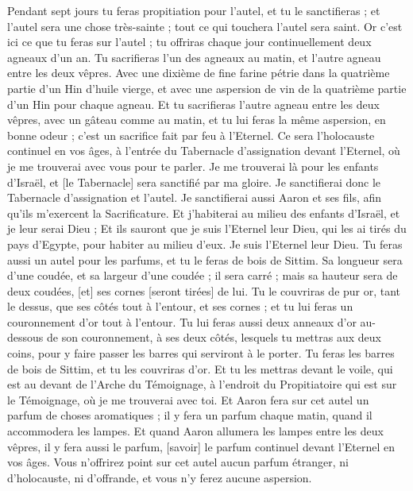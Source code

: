 \begin{multicols}{2}
Pendant sept jours tu feras propitiation pour l'autel, et tu le sanctifieras ; et l'autel sera une chose très-sainte ; tout ce qui touchera l'autel sera saint.
Or c'est ici ce que tu feras sur l'autel ; tu offriras chaque jour continuellement deux agneaux d'un an.
Tu sacrifieras l'un des agneaux au matin, et l'autre agneau entre les deux vêpres.
Avec une dixième de fine farine pétrie dans la quatrième partie d'un Hin d’huile vierge, et avec une aspersion de vin de la quatrième partie d'un Hin pour chaque agneau.
Et tu sacrifieras l'autre agneau entre les deux vêpres, avec un gâteau comme au matin, et tu lui feras la même aspersion, en bonne odeur ; c'est un sacrifice fait par feu à l'Eternel.
Ce sera l'holocauste continuel en vos âges, à l'entrée du Tabernacle d'assignation devant l'Eternel, où je me trouverai avec vous pour te parler.
Je me trouverai là pour les enfants d'Israël, et [le Tabernacle] sera sanctifié par ma gloire.
Je sanctifierai donc le Tabernacle d'assignation et l'autel. Je sanctifierai aussi Aaron et ses fils, afin qu'ils m'exercent la Sacrificature.
Et j'habiterai au milieu des enfants d'Israël, et je leur serai Dieu ;
Et ils sauront que je suis l'Eternel leur Dieu, qui les ai tirés du pays d'Egypte, pour habiter au milieu d'eux. Je suis l'Eternel leur Dieu.
\VerseOne{}Tu feras aussi un autel pour les parfums, et tu le feras de bois de Sittim.
Sa longueur sera d'une coudée, et sa largeur d'une coudée ; il sera carré ; mais sa hauteur sera de deux coudées, [et] ses cornes [seront tirées] de lui.
Tu le couvriras de pur or, tant le dessus, que ses côtés tout à l’entour, et ses cornes ; et tu lui feras un couronnement d'or tout à l’entour.
Tu lui feras aussi deux anneaux d'or au-dessous de son couronnement, à ses deux côtés, lesquels tu mettras aux deux coins, pour y faire passer les barres qui serviront à le porter.
Tu feras les barres de bois de Sittim, et tu les couvriras d'or.
Et tu les mettras devant le voile, qui est au devant de l'Arche du Témoignage, à l'endroit du Propitiatoire qui est sur le Témoignage, où je me trouverai avec toi.
Et Aaron fera sur cet autel un parfum de choses aromatiques ; il y fera un parfum chaque matin, quand il accommodera les lampes.
Et quand Aaron allumera les lampes entre les deux vêpres, il y fera aussi le parfum, [savoir] le parfum continuel devant l'Eternel en vos âges.
Vous n'offrirez point sur cet autel aucun parfum étranger, ni d'holocauste, ni d'offrande, et vous n'y ferez aucune aspersion.

\end{multicols}
